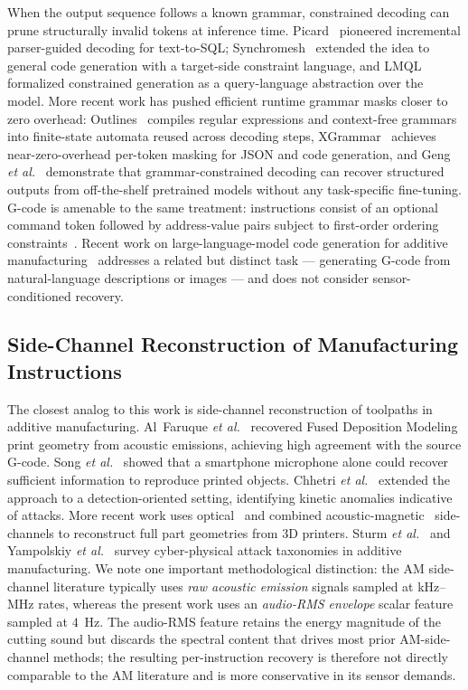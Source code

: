 \documentclass[sensors,article,submit,moreauthors,pdftex]{Definitions/mdpi}
\newcommand{\etal}{\textit{et al.}}
\begin{document}
When the output sequence follows a known grammar, constrained decoding can prune structurally invalid tokens at inference time. Picard~\cite{picard} pioneered incremental parser-guided decoding for text-to-SQL; Synchromesh~\cite{synchromesh} extended the idea to general code generation with a target-side constraint language, and LMQL~\cite{lmql} formalized constrained generation as a query-language abstraction over the model. More recent work has pushed efficient runtime grammar masks closer to zero overhead: Outlines~\cite{outlines} compiles regular expressions and context-free grammars into finite-state automata reused across decoding steps, XGrammar~\cite{xgrammar} achieves near-zero-overhead per-token masking for JSON and code generation, and Geng \etal~\cite{geng2023gcd} demonstrate that grammar-constrained decoding can recover structured outputs from off-the-shelf pretrained models without any task-specific fine-tuning. G-code is amenable to the same treatment: instructions consist of an optional command token followed by address-value pairs subject to first-order ordering constraints~\cite{grammar_paper,gcode_foundational}. Recent work on large-language-model code generation for additive manufacturing~\cite{gllm,image2gcode,chatcnc} addresses a related but distinct task --- generating G-code from natural-language descriptions or images --- and does not consider sensor-conditioned recovery.

\subsection{Side-Channel Reconstruction of Manufacturing Instructions}
\label{sec:related-sidechan}

The closest analog to this work is side-channel reconstruction of toolpaths in additive manufacturing. Al~Faruque \etal~\cite{alfaruque2016acoustic} recovered Fused Deposition Modeling print geometry from acoustic emissions, achieving high agreement with the source G-code. Song \etal~\cite{song2016my} showed that a smartphone microphone alone could recover sufficient information to reproduce printed objects. Chhetri \etal~\cite{chhetri2016kcad} extended the approach to a detection-oriented setting, identifying kinetic anomalies indicative of attacks. More recent work uses optical~\cite{chattopadhyay2025video} and combined acoustic-magnetic~\cite{jamarani2024screg} side-channels to reconstruct full part geometries from 3D printers. Sturm \etal~\cite{sturm2014cyber} and Yampolskiy \etal~\cite{yampolskiy2018security} survey cyber-physical attack taxonomies in additive manufacturing. We note one important methodological distinction: the AM side-channel literature typically uses \emph{raw acoustic emission} signals sampled at kHz--MHz rates, whereas the present work uses an \emph{audio-RMS envelope} scalar feature sampled at $4$~Hz. The audio-RMS feature retains the energy magnitude of the cutting sound but discards the spectral content that drives most prior AM-side-channel methods; the resulting per-instruction recovery is therefore not directly comparable to the AM literature and is more conservative in its sensor demands.
\end{document}
